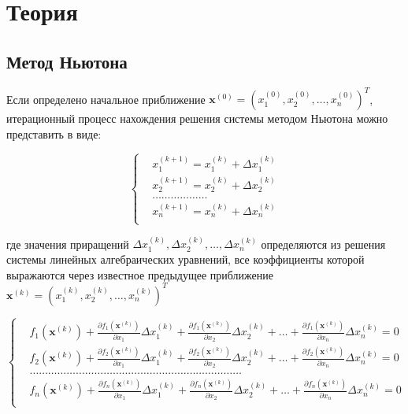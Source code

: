\section*{Теория}

\subsection*{Метод Ньютона}

Если определено начальное приближение 
$\textbf{x}^{(0)}=(x^{(0)}_1,x^{(0)}_2,\dots,x^{(0)}_n)^T$,
итерационный процесс нахождения решения системы методом Ньютона можно
представить в виде:

$$\left\{\begin{aligned}
    &x^{(k + 1)}_1 = x^{(k)}_1 + \Delta x^{(k)}_1 \\
    &x^{(k + 1)}_2 = x^{(k)}_2 + \Delta x^{(k)}_2 \\
    &\dots\dots\dots\dots\dots\dots \\
    &x^{(k + 1)}_n = x^{(k)}_n + \Delta x^{(k)}_n \\
\end{aligned}\right.$$

где значения приращений
$\Delta x^{(k)}_1,\Delta x^{(k)}_2,\dots,\Delta x^{(k)}_n$
определяются из решения системы
линейных алгебраических уравнений, все коэффициенты которой выражаются через
известное предыдущее приближение
$\textbf{x}^{(k)}=(x^{(k)}_1,x^{(k)}_2,\dots,x^{(k)}_n)^T$

$$\left\{\begin{aligned}
    &f_1(\textbf{x}^{(k)})
        + \frac{\partial f_1(\textbf{x}^{(k)})}{\partial x_1}\Delta x^{(k)}_1
        + \frac{\partial f_1(\textbf{x}^{(k)})}{\partial x_2}\Delta x^{(k)}_2 + \dots
        + \frac{\partial f_1(\textbf{x}^{(k)})}{\partial x_n}\Delta x^{(k)}_n = 0 \\
    &f_2(\textbf{x}^{(k)})
        + \frac{\partial f_2(\textbf{x}^{(k)})}{\partial x_1}\Delta x^{(k)}_1
        + \frac{\partial f_2(\textbf{x}^{(k)})}{\partial x_2}\Delta x^{(k)}_2 + \dots
        + \frac{\partial f_2(\textbf{x}^{(k)})}{\partial x_n}\Delta x^{(k)}_n = 0 \\
    &\dots\dots\dots\dots\dots\dots\dots\dots\dots\dots\dots\dots\dots
        \dots\dots\dots\dots\dots\dots\dots\dots\dots\dots \\
    &f_n(\textbf{x}^{(k)})
        + \frac{\partial f_n(\textbf{x}^{(k)})}{\partial x_1}\Delta x^{(k)}_1
        + \frac{\partial f_n(\textbf{x}^{(k)})}{\partial x_2}\Delta x^{(k)}_2 + \dots
        + \frac{\partial f_n(\textbf{x}^{(k)})}{\partial x_n}\Delta x^{(k)}_n = 0 \\
\end{aligned}\right.$$

